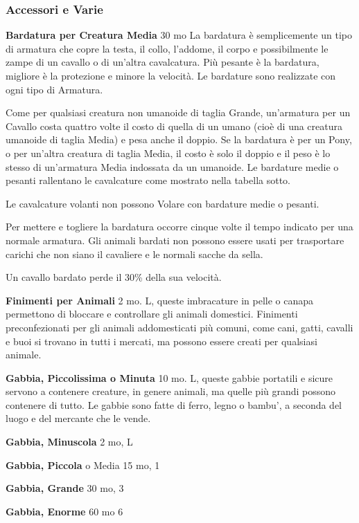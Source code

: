 \documentclass[a4paper,11pt,twoside,openany]{book}
\begin{document}
\subsubsection{Accessori e Varie}

\label{accessori-e-varie}

\textbf{Bardatura per Creatura Media} 30 mo La bardatura è semplicemente un tipo di armatura che copre la testa, il collo, l'addome, il corpo e possibilmente le zampe di un cavallo o di un'altra cavalcatura. Più pesante è la bardatura, migliore è la protezione e minore la velocità. Le bardature sono realizzate con ogni tipo di Armatura.

Come per qualsiasi creatura non umanoide di taglia Grande, un'armatura per un Cavallo costa quattro volte il costo di quella di un umano (cioè di una creatura umanoide di taglia Media) e pesa anche il doppio. Se la bardatura è per un Pony, o per un'altra creatura di taglia Media, il costo è solo il doppio e il peso è lo stesso di un'armatura Media indossata da un umanoide. Le bardature medie o pesanti rallentano le cavalcature come mostrato nella tabella sotto.

Le cavalcature volanti non possono Volare con bardature medie o pesanti.

Per mettere e togliere la bardatura occorre cinque volte il tempo indicato per una normale armatura. Gli animali bardati non possono essere usati per trasportare carichi che non siano il cavaliere e le normali sacche da sella.

Un cavallo bardato perde il 30\% della sua velocità.

\textbf{Finimenti per Animali} 2 mo. L, queste imbracature in pelle o canapa permettono di bloccare e controllare gli animali domestici. Finimenti preconfezionati per gli animali addomesticati più comuni, come cani, gatti, cavalli e buoi si trovano in tutti i mercati, ma possono essere creati per qualsiasi animale.

\textbf{Gabbia, Piccolissima o Minuta} 10 mo. L, queste gabbie portatili e sicure servono a contenere creature, in genere animali, ma quelle più grandi possono contenere di tutto. Le gabbie sono fatte di ferro, legno o bambu', a seconda del luogo e del mercante che le vende.

\textbf{Gabbia, Minuscola} 2 mo, L

\textbf{Gabbia, Piccola} o Media 15 mo, 1

\textbf{Gabbia, Grande} 30 mo, 3

\textbf{Gabbia, Enorme} 60 mo 6
\end{document}
